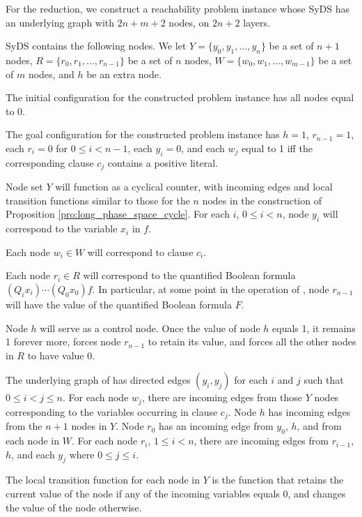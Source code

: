 For the reduction, we construct a reachability problem instance whose SyDS \cals{} 
has an underlying graph with $2n+m+2$ nodes, on $2n+2$ layers. 

SyDS \cals{} contains the following nodes.
We let $Y = \{y_0, y_1, \dots , y_n\}$ be a set of $n+1$ nodes,
$R = \{r_0, r_1, \dots , r_{n-1}\}$ be a set of $n$ nodes,
$W = \{w_0, w_1, \dots , w_{m-1}\}$ be a set of $m$ nodes,
 and $h$ be an extra node.
 
The initial configuration \calc{} for the constructed problem instance
 has all nodes equal to 0.

The goal configuration \cald{} for the constructed problem instance 
has $h =1$, $r_{n-1} = 1$,  each  $r_i= 0$ for $0 \leq i  < n-1$, 
each  $y_i= 0$, 
and each $w_j$ equal to 1 iff the corresponding clause $c_j$ contains a positive literal.

Node set $Y$ will function as a cyclical counter,
with incoming edges and local transition functions similar to those for
the $n$ nodes in the construction of Proposition \ref{pro:long_phase_space_cycle}.
For each $i$, $0 \leq i < n$,
node $y_i$ will correspond to the variable $x_i$ in $f$.

Each node $w_i \in W$ will correspond to clause $c_i$.

Each node $r_i \in R$ will correspond to the quantified Boolean formula
$(Q_i x_i) \cdots  (Q_0 x_0) f$.
In particular, at some point in the operation of \cals{},
node $r_{n-1}$ will have the value of the quantified Boolean formula $F$.

Node $h$ will serve as a control node.
Once the value of node $h$ equals 1,  it remains 1 forever more,
forces node $r_{n-1}$ to retain its value, and forces all the other nodes in $R$ to have value 0.

The underlying graph of \cals{} has directed edges
$(y_i, y_j)$ for each $i$ and $j$ such that $0 \leq i < j \leq n$.
For each node $w_j$, there are incoming edges from those $Y$ nodes
corresponding to the variables occurring in clause $c_j$.
Node $h$ has incoming edges from the $n+1$ nodes in $Y$.
Node $r_0$ has an incoming edge from $y_0$, $h$, and from each node in $W$.
For each node $r_i$, $1 \leq i < n$,
there are incoming edges from $r_{i-1}$, $h$, and each $y_j$ where $0 \leq j \leq i$.


The local transition function for each node in $Y$ is the function 
that retains the current value of the node if any of the incoming variables equals 0,
and changes the value of the node otherwise.

